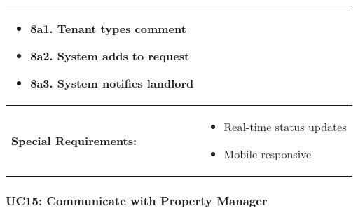 \documentclass[12pt]{article}
\begin{document}
\begin{longtable}{|p{3cm}|p{11cm}|}
\begin{itemize}
    \item 8a1. Tenant types comment
    \item 8a2. System adds to request
    \item 8a3. System notifies landlord
\end{itemize} \\
\hline
\textbf{Special Requirements:} & 
\begin{itemize}
    \item Real-time status updates
    \item Mobile responsive
\end{itemize} \\
\hline
\end{longtable}

\subsubsection{UC15: Communicate with Property Manager}
\end{document}
